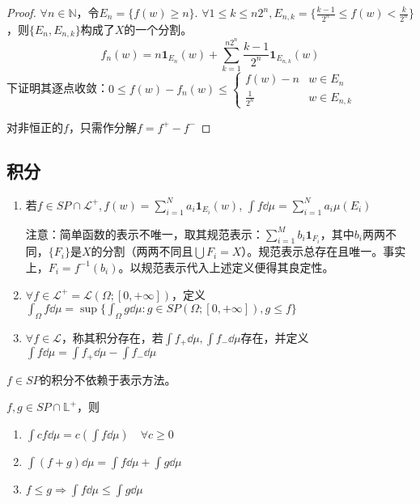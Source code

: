 \documentclass{ctexbook}
\begin{document}
\begin{proof}
  $\forall n\in\mathbb{N}$，令$E_{n}=\{f(w)\geq n\}$. $\forall 1\leq k\leq n2^{n}, E_{n,k}=\{\frac{k-1}{2^{n}}\leq f(w)<\frac{k}{2^{n}}\}$，则$\{E_{n},E_{n,k}\}$构成了$X$的一个分割。
  \[f_{n}(w)=n\bm 1_{E_{n}}(w)+\sum_{k=1}^{n2^{n}}\frac{k-1}{2^{n}}\bm{1}_{E_{n,k}}(w)\]
下证明其逐点收敛：$0\leq f(w)-f_{n}(w)\leq
\begin{cases}
  f(w)-n&w\in E_{n}\\ \frac{1}{2^{n}}&w\in E_{n,k}
\end{cases}
$

对非恒正的$f$，只需作分解$f=f^{+}-f^{-}$
\end{proof}

\subsection{积分}
\begin{Def}
  \begin{enumerate}
  \item 若$f\in SP\cap\mathcal{L}^{+},f(w)=\sum_{i=1}^{N}a_{i}\bm{1}_{E_{i}}(w)$, $\int f\dd\mu=\sum_{i=1}^{N}a_{i}\mu(E_{i})$

    注意：简单函数的表示不唯一，取其规范表示：$\sum_{i=1}^{M}b_{i}\bm{1}_{F_{i}}$，其中$b_{i}$两两不同，$\{F_{i}\}$是$X$的分割（两两不同且$\bigcup F_{i}=X$）。规范表示总存在且唯一。事实上，$F_{i}=f^{-1}(b_{i})$。以规范表示代入上述定义便得其良定性。

  \item $\forall f\in\mathcal{L}^{+}=\mathcal{L}(\Omega;[0,+\infty])$，定义$\int_{\Omega}f\dd\mu=\sup\{\int_{\Omega} g\dd \mu:g\in SP(\Omega;[0,+\infty]),g\leq f\}$
  \item $\forall f\in\mathcal{L}$，称其积分存在，若$\int f_{+}\dd\mu,\int f_{-}\dd\mu$存在，并定义$\int f\dd\mu=\int f_{+}\dd\mu-\int f_{-}\dd\mu$
  \end{enumerate}
\end{Def}


\begin{Prop}
  $f\in SP$的积分不依赖于表示方法。
\end{Prop}

\begin{Prop}
  $f,g\in SP\cap \mathbb{L}^{+}$，则
  \begin{enumerate}
  \item $\int cf\dd\mu=c(\int f\dd\mu)\quad\forall c\geq 0$
  \item $\int(f+g)\dd \mu=\int f\dd\mu+\int g\dd\mu$
  \item $f\leq g\Rightarrow \int f\dd\mu\leq\int g\dd\mu$
  \end{enumerate}
\end{Prop}
\end{document}
